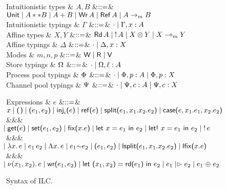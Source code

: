 \begin{figure*}[t]
  \begin{grammar}
    Intuitionistic types
    & $A,B$
    &$\mathrel{::=}$& $\text{\textsf{Unit}} \mathrel{\mid} {A} ** {B} \mathrel{\mid} {A} + {B} \mathrel{\mid}
    \text{\textsf{Wr}}\,A \mathrel{\mid} \text{\textsf{Ref}}\,A \mathrel{\mid} {A}\rightarrow_{\footnotesize m}{B}$
    \\
    Intuitionistic typings
    & $\Gamma$
    &$\mathrel{::=}$& $\cdot \mathrel{\mid} \Gamma,x:A$
    \\
    Affine types
    & $X,Y$
    &$\mathrel{::=}$& $\text{\textsf{Rd}}\,A \mathrel{\mid} {!}\,{A} \mathrel{\mid} {X}\otimes{Y} \mathrel{\mid}
    {X}\multimap_{\footnotesize m}{Y}$
    \\
    Affine typings
    & $\Delta$
    &$\mathrel{::=}$& $\cdot \mathrel{\mid} \Delta,x:X$
    \\
    Modes & $m,n,p$ &$\mathrel{::=}$& $\textsf{W} \mathrel{\mid} \textsf{R} \mathrel{\mid} \textsf{V}$    
    \\[2mm]
    Store typings
    & $\Omega$
    &$\mathrel{::=}$& $\cdot \mathrel{\mid} \Omega,\ell:A$
    \\
    Process pool typings
    & $\Phi$
    &$\mathrel{::=}$& $\cdot \mathrel{\mid} \Phi,p:A \mathrel{\mid} \Phi,p:X$
    \\
    Channel pool typings
    & $\Psi$
    &$\mathrel{::=}$& $\cdot \mathrel{\mid} \Psi,c:A \mathrel{\mid} \Psi,c:X$
  \end{grammar}
  \begin{grammar}
    Expressions
    & $e$
        &$\mathrel{::=}$&
        $\eVar{x} \bnfalt \eUnit \bnfalt \ePair{e_1}{e_2} \bnfalt \eInj{i}{e}
    \bnfalt \eRef{e} \bnfalt \eSplit{e_1}{x_1}{x_2}{e_2} \bnfalt
    \eCase{e}{x_1}{e_1}{x_2}{e_2}$
    \\ &&& $\hspace{-1.02ex}\mathrel{\mid} \text{\textsf{get}}\textsf{(}{e}\textsf{)} \mathrel{\mid} \text{\textsf{set}}\textsf{(}{e_1},{e_2}\textsf{)} \mathrel{\mid} \text{\textsf{fix}}\textsf{(}{x}.{e}\textsf{)}
    \mathrel{\mid} \text{\textsf{let}}\ {x} = {e_1}\ \text{\textsf{in}}\ {e_2} \mathrel{\mid} \text{\textsf{let!}}\ {x} = {e_1}\ \text{\textsf{in}}\ {e_2} \mathrel{\mid} {!}\,{e}$
    \\ &&& $\hspace{-1.02ex}\mathrel{\mid} \lambda{x}.\,{e} \mathrel{\mid} e_1\,e_2 \mathrel{\mid} \Lambda{x}.\,{e}
    \mathrel{\mid} {e_1}{\sim}{e_2} \mathrel{\mid} \textsf{(}{e_1},{e_2}\textsf{)} \mathrel{\mid}
    \text{\textsf{lsplit}}\textsf{(}{e_1},{x_1}.{x_2}.{e_2}\textsf{)} \mathrel{\mid} \text{\textsf{lfix}}\textsf{(}{x}.{e}\textsf{)}$
    \\ &&& $\hspace{-1.02ex}\mathrel{\mid} \nu(x_1,x_2).\,e \mathrel{\mid} \text{\textsf{wr}}\textsf{(}{e_1},{e_2}\textsf{)}
    \mathrel{\mid} \text{\textsf{let}}\ {\textsf{(}{x_1},{x_2}\textsf{)}} = {\text{\textsf{rd}}\textsf{(}{e_1}\textsf{)}}\ \text{\textsf{in}}\ {{e_2}} \mathrel{\mid} e_1 \mathrel{|\rhd} e_2 \mathrel{\mid} e_1 \mathrel{\oplus} e_2$
  \end{grammar}
  \caption{Syntax of ILC. }
  \label{fig:ilc-syntax}
\end{figure*}
